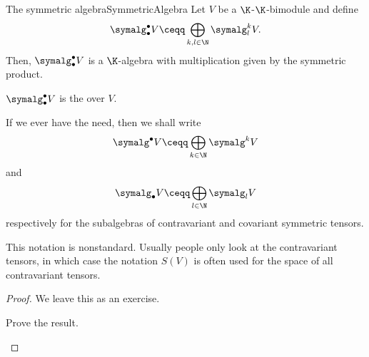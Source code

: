 \begin{thm}{The symmetric algebra}{SymmetricAlgebra}
	Let $V$ be a $\K$-$\K$-bimodule and define
	\begin{equation}
		\symalg _{\bullet}^{\bullet}V\ceqq \bigoplus _{k,l\in \N}\symalg _l^kV.
	\end{equation} 
	Then, $\symalg _{\bullet}^{\bullet}V$ is a $\K$-algebra with multiplication given by the symmetric product.
	\begin{rmk}
		$\symalg _{\bullet}^{\bullet}V$ is the  over $V$.
	\end{rmk}
	\begin{rmk}
		If we ever have the need, then we shall write
		\begin{equation}
			\symalg ^{\bullet}V\ceqq \bigoplus _{k\in \N}\symalg ^kV
		\end{equation}\index[notation]{$\symalg ^{\bullet}V$}
		and
		\begin{equation}
			\symalg _{\bullet}V\ceqq \bigoplus _{l\in \N}\symalg _lV
		\end{equation}\index[notation]{$\symalg _{\bullet}V$}
		respectively for the subalgebras of contravariant and covariant symmetric tensors.
	\end{rmk}
	\begin{rmk}
		This notation is nonstandard.  Usually people only look at the contravariant tensors, in which case the notation $S(V)$ is often used for the space of all contravariant tensors.
	\end{rmk}
	\begin{proof}
		We leave this as an exercise.
		\begin{exr}[breakable=false]{}{}
			Prove the result.
		\end{exr}
	\end{proof}
\end{thm}
